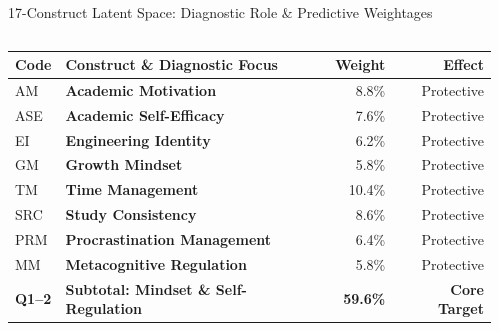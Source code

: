 \documentclass{beamer}
\begin{document}
\begin{frame}[t]{17-Construct Latent Space: Diagnostic Role \& Predictive Weightages}
  \begin{columns}[T]
    \begin{column}{0.49\textwidth}
      \begin{tcolorbox}[colback=white, colframe=BlueDeep, arc=1.2mm, boxrule=0.8pt, top=0.3mm, bottom=0.3mm, left=0.5mm, right=0.5mm, title={\scriptsize\bfseries\color{white}Mindset \& Executive Regulation (8 Constructs)}, colbacktitle=BlueDeep]
        \centering\fontsize{4.4pt}{5.2pt}\selectfont
        \renewcommand{\arraystretch}{0.65}
        \begin{tabularx}{\linewidth}{@{}l X r r@{}}
          \toprule
          \textbf{Code} & \textbf{Construct \& Diagnostic Focus} & \textbf{Weight} & \textbf{Effect} \\
          \midrule
          \rowcolor{BlueLight} AM & \textbf{Academic Motivation} & 8.8\% & Protective \\
          \rowcolor{BlueLight} ASE & \textbf{Academic Self-Efficacy} & 7.6\% & Protective \\
          \rowcolor{BlueLight} EI & \textbf{Engineering Identity} & 6.2\% & Protective \\
          \rowcolor{BlueLight} GM & \textbf{Growth Mindset} & 5.8\% & Protective \\
          \midrule
          \rowcolor{CanvasBG} TM & \textbf{Time Management} & 10.4\% & Protective \\
          \rowcolor{CanvasBG} SRC & \textbf{Study Consistency} & 8.6\% & Protective \\
          \rowcolor{CanvasBG} PRM & \textbf{Procrastination Management} & 6.4\% & Protective \\
          \rowcolor{CanvasBG} MM & \textbf{Metacognitive Regulation} & 5.8\% & Protective \\
          \midrule
          \textbf{Q1--2} & \textbf{Subtotal: Mindset \& Self-Regulation} & \textbf{59.6\%} & \textbf{Core Target} \\
          \bottomrule
        \end{tabularx}
      \end{tcolorbox}
    \end{column}
    \begin{column}{0.49\textwidth}
      \begin{tcolorbox}[colback=white, colframe=BluePrimary, arc=1.2mm, boxrule=0.8pt, top=0.3mm, bottom=0.3mm, left=0.5mm, right=0.5mm, title={\scriptsize\bfseries\color{white}Somatic, Social \& Affective (9 Constructs)}, colbacktitle=BluePrimary]
        \centering\fontsize{4.4pt}{5.2pt}\selectfont

\end{tcolorbox}
\end{column}
\end{columns}
\end{frame}
\end{document}
